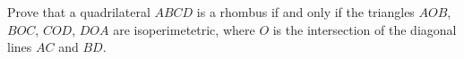 Prove that a quadrilateral $ABCD$ is a rhombus
if and only if the triangles $AOB$, $BOC$, $COD$, $DOA$ are isoperimetetric,
where $O$ is the intersection of the diagonal lines $AC$ and $BD$.
